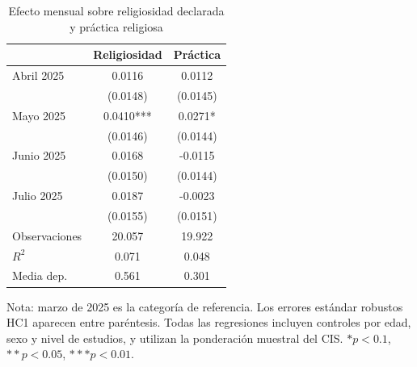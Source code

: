 \begin{table}[H]
\centering
\caption{Efecto mensual sobre religiosidad declarada y práctica religiosa}
\label{tab:religiosidad-practica-completa}
\small
\begin{tabular}{lcc}
\hline
 & Religiosidad & Práctica \\
\hline
Abril 2025 & 0.0116 & 0.0112 \\
 & (0.0148) & (0.0145) \\
Mayo 2025 & 0.0410*** & 0.0271* \\
 & (0.0146) & (0.0144) \\
Junio 2025 & 0.0168 & -0.0115 \\
 & (0.0150) & (0.0144) \\
Julio 2025 & 0.0187 & -0.0023 \\
 & (0.0155) & (0.0151) \\
Observaciones & 20.057 & 19.922 \\
$R^2$ & 0.071 & 0.048 \\
Media dep. & 0.561 & 0.301 \\
\hline
\end{tabular}
\begin{flushleft}
\footnotesize Nota: marzo de 2025 es la categoría de referencia. Los errores estándar robustos HC1 aparecen entre paréntesis. Todas las regresiones incluyen controles por edad, sexo y nivel de estudios, y utilizan la ponderación muestral del CIS. $* p<0.1$, $** p<0.05$, $*** p<0.01$.
\end{flushleft}
\end{table}
